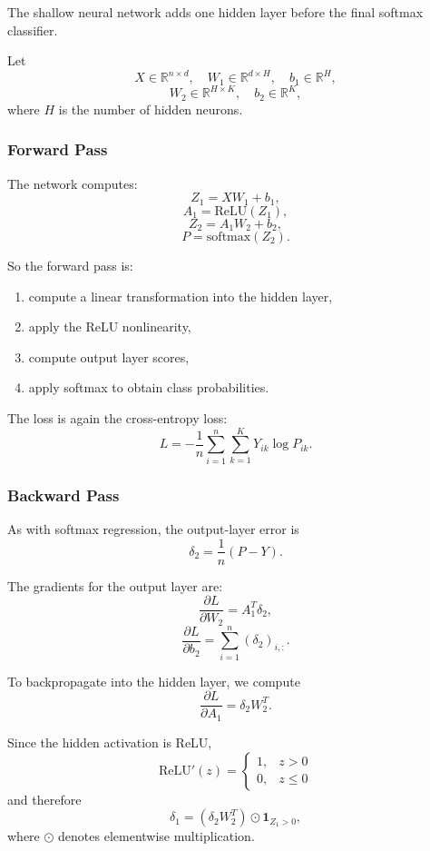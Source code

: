 \documentclass[11pt]{article}
\begin{document}
The shallow neural network adds one hidden layer before the final softmax classifier.

Let
\[
X \in \mathbb{R}^{n \times d},
\quad
W_1 \in \mathbb{R}^{d \times H},
\quad
b_1 \in \mathbb{R}^{H},
\]
\[
W_2 \in \mathbb{R}^{H \times K},
\quad
b_2 \in \mathbb{R}^{K},
\]
where $H$ is the number of hidden neurons.

\subsubsection*{Forward Pass}

The network computes:
\[
Z_1 = XW_1 + b_1,
\]
\[
A_1 = \mathrm{ReLU}(Z_1),
\]
\[
Z_2 = A_1W_2 + b_2,
\]
\[
P = \mathrm{softmax}(Z_2).
\]

So the forward pass is:
\begin{enumerate}
    \item compute a linear transformation into the hidden layer,
    \item apply the ReLU nonlinearity,
    \item compute output layer scores,
    \item apply softmax to obtain class probabilities.
\end{enumerate}

The loss is again the cross-entropy loss:
\[
L
=
-\frac{1}{n}\sum_{i=1}^{n}\sum_{k=1}^{K} Y_{ik}\log P_{ik}.
\]

\subsubsection*{Backward Pass}

As with softmax regression, the output-layer error is
\[
\delta_2
=
\frac{1}{n}(P - Y).
\]

The gradients for the output layer are:
\[
\frac{\partial L}{\partial W_2}
=
A_1^T \delta_2,
\]
\[
\frac{\partial L}{\partial b_2}
=
\sum_{i=1}^{n} (\delta_2)_{i,:}.
\]

To backpropagate into the hidden layer, we compute
\[
\frac{\partial L}{\partial A_1}
=
\delta_2 W_2^T.
\]

Since the hidden activation is ReLU,
\[
\mathrm{ReLU}'(z)
=
\begin{cases}
1, & z > 0 \\
0, & z \le 0
\end{cases}
\]
and therefore
\[
\delta_1
=
(\delta_2 W_2^T)\odot \mathbf{1}_{Z_1 > 0},
\]
where $\odot$ denotes elementwise multiplication.
\end{document}
